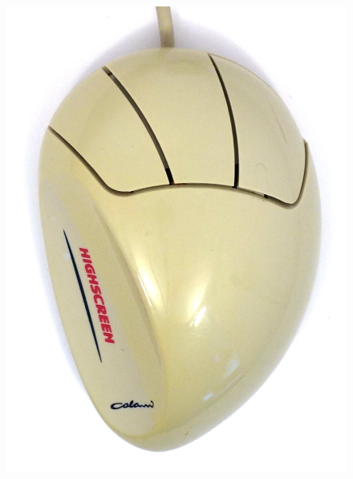 \documentclass[11pt, a4paper]{article}
\begin{document}
\begin{figure}[h]
    \centering
    \includegraphics[scale=0.5]{1993_colani_mouse/top_60.jpg}

\end{figure}
\end{document}
